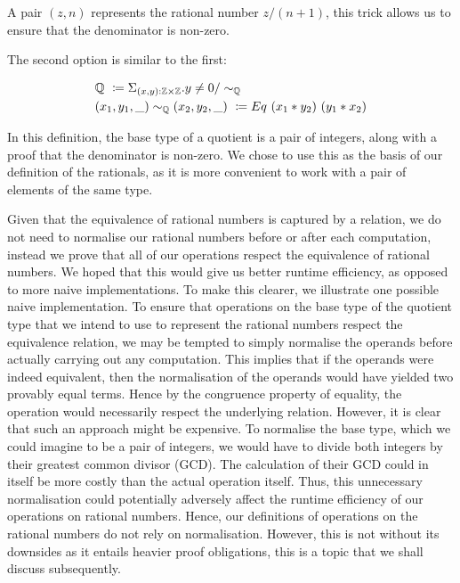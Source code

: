 \documentclass[12pt,twoside,maitrise]{dms}
\theoremstyle{definition}
\numberwithin{equation}{section}
\numberwithin{table}{chapter}
\numberwithin{figure}{chapter}
\begin{document}
A pair $(z , n)$ represents the rational number $z / (n + 1)$, this trick allows us to ensure that the denominator is non-zero.

The second option is similar to the first:

\begin{align*}
  & \mathbb{Q} \ \coloneqq \Sigma_{\oftype{(x, y)}{\mathbb{Z} \times \mathbb{Z}}} . y \ne 0 / \sim_{\mathbb{Q}} \\
  & (x_1 , y_1, \_) \sim_{\mathbb{Q}} (x_2 , y_2, \_) \ \coloneqq Eq \ (x_1 * y_2) \ (y_1 * x_2)
\end{align*}

In this definition, the base type of a quotient is a pair of integers, along
with a proof that the denominator is non-zero. We chose to use this as the basis
of our definition of the rationals, as it is more convenient to work with a pair
of elements of the same type.

Given that the equivalence of rational numbers is captured by a relation, we do
not need to normalise our rational numbers before or after each computation,
instead we prove that all of our operations respect the equivalence of rational
numbers. We hoped that this would give us better runtime efficiency, as opposed
to more naive implementations. To make this clearer, we illustrate one possible
naive implementation. To ensure that operations on the base type of the quotient
type that we intend to use to represent the rational numbers respect the
equivalence relation, we may be tempted to simply normalise the operands before
actually carrying out any computation. This implies that if the operands were
indeed equivalent, then the normalisation of the operands would have yielded two
provably equal terms. Hence by the congruence property of equality, the
operation would necessarily respect the underlying relation. However, it is
clear that such an approach might be expensive. To normalise the base type,
which we could imagine to be a pair of integers, we would have to divide both
integers by their greatest common divisor (GCD). The calculation of their GCD
could in itself be more costly than the actual operation itself. Thus, this
unnecessary normalisation could potentially adversely affect the runtime
efficiency of our operations on rational numbers. Hence, our definitions of
operations on the rational numbers do not rely on normalisation. However, this
is not without its downsides as it entails heavier proof obligations, this is a
topic that we shall discuss subsequently.
\end{document}
